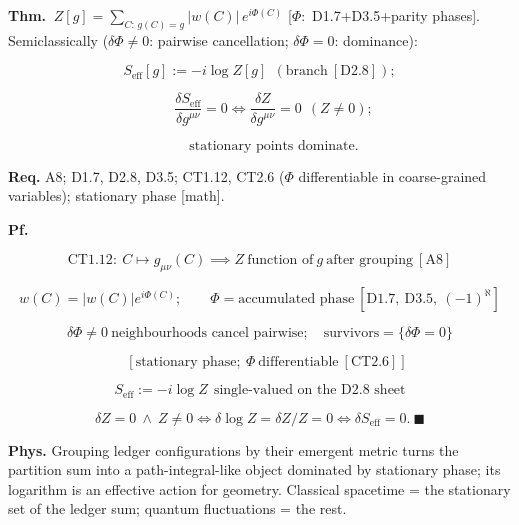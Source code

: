 \begin{theorem}\label{tag:CT1-20}
\textbf{Thm.} $\ Z[g]=\sum_{C:\,g(C)=g}|w(C)|\,e^{i\Phi(C)}$ [$\Phi:$ D1.7+D3.5+parity phases]. Semiclassically ($\delta\Phi\ne0$: pairwise cancellation; $\delta\Phi=0$: dominance):

\[
S_{\mathrm{eff}}[g]:=-i\log Z[g]\ \ (\text{branch}\ [\mathrm{D2.8}]);
\]

\[
\qquad \frac{\delta S_{\mathrm{eff}}}{\delta g^{\mu\nu}}=0\iff\frac{\delta Z}{\delta g^{\mu\nu}}=0\ \ (Z\ne0);
\]

\[
\qquad \text{stationary points dominate}.
\]

\textbf{Req.} A8; D1.7, D2.8, D3.5; CT1.12, CT2.6 ($\Phi$ differentiable in coarse-grained variables); stationary phase [math].

\textbf{Pf.}

\[
\mathrm{CT1.12}:\ C\mapsto g_{\mu\nu}(C)\implies Z\ \text{function of}\ g\ \text{after grouping}\ [\mathrm{A8}]
\]

\[
w(C)=|w(C)|e^{i\Phi(C)};\qquad\Phi=\text{accumulated phase}\ [\mathrm{D1.7},\ \mathrm{D3.5},\ (-1)^\aleph]
\]

\[
\delta\Phi\ne0\ \text{neighbourhoods cancel pairwise};\quad\text{survivors}=\{\delta\Phi=0\}
\]

\[
\quad [\text{stationary phase};\ \Phi\ \text{differentiable}\ [\mathrm{CT2.6}]]
\]

\[
S_{\mathrm{eff}}:=-i\log Z\ \ \text{single-valued on the D2.8 sheet}
\]

\[
\delta Z=0\ \wedge\ Z\ne0\iff\delta\log Z=\delta Z/Z=0\iff\delta S_{\mathrm{eff}}=0.\ \blacksquare
\]

\textbf{Phys.} Grouping ledger configurations by their emergent metric turns the partition sum into a path-integral-like object dominated by stationary phase; its logarithm is an effective action for geometry. Classical spacetime = the stationary set of the ledger sum; quantum fluctuations = the rest.

\end{theorem}

